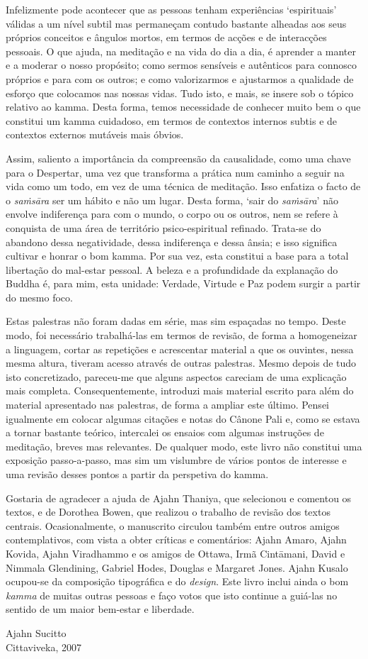 Infelizmente pode acontecer que as pessoas tenham experiências `espirituais'
válidas a um nível subtil mas permaneçam contudo bastante alheadas aos seus
próprios conceitos e ângulos mortos, em termos de acções e de interacções
pessoais. O que ajuda, na meditação e na vida do dia a dia, é aprender a manter
e a moderar o nosso propósito; como sermos sensíveis e autênticos para connosco
próprios e para com os outros; e como valorizarmos e ajustarmos a qualidade de
esforço que colocamos nas nossas vidas. Tudo isto, e mais, se insere sob o
tópico relativo ao kamma. Desta forma, temos necessidade de conhecer muito bem o
que constitui um kamma cuidadoso, em termos de contextos internos subtis e de
contextos externos mutáveis mais óbvios.

Assim, saliento a importância da compreensão da causalidade, como uma chave para
o Despertar, uma vez que transforma a prática num caminho a seguir na vida como
um todo, em vez de uma técnica de meditação. Isso enfatiza o facto de o
\emph{saṁsāra} ser um hábito e não um lugar. Desta forma, `sair do
\emph{saṁsāra}' não envolve indiferença para com o mundo, o corpo ou os outros,
nem se refere à conquista de uma área de território psico-espiritual refinado.
Trata-se do abandono dessa negatividade, dessa indiferença e dessa ânsia; e isso
significa cultivar e honrar o bom kamma. Por sua vez, esta constitui a base para
a total libertação do mal-estar pessoal. A beleza e a profundidade da explanação
do Buddha é, para mim, esta unidade: Verdade, Virtude e Paz podem surgir a
partir do mesmo foco.

Estas palestras não foram dadas em série, mas sim espaçadas no tempo. Deste
modo, foi necessário trabalhá-las em termos de revisão, de forma a homogeneizar
a linguagem, cortar as repetições e acrescentar material a que os ouvintes,
nessa mesma altura, tiveram acesso através de outras palestras. Mesmo depois de
tudo isto concretizado, pareceu-me que alguns aspectos careciam de uma
explicação mais completa. Consequentemente, introduzi mais material escrito para
além do material apresentado nas palestras, de forma a ampliar este último.
Pensei igualmente em colocar algumas citações e notas do Cânone Pali e, como se
estava a tornar bastante teórico, intercalei os ensaios com algumas instruções
de meditação, breves mas relevantes. De qualquer modo, este livro não constitui
uma exposição passo-a-passo, mas sim um vislumbre de vários pontos de interesse
e uma revisão desses pontos a partir da perspetiva do kamma.

Gostaria de agradecer a ajuda de Ajahn Thaniya, que selecionou e comentou os
textos, e de Dorothea Bowen, que realizou o trabalho de revisão dos textos
centrais. Ocasionalmente, o manuscrito circulou também entre outros amigos
contemplativos, com vista a obter críticas e comentários: Ajahn Amaro, Ajahn
Kovida, Ajahn Viradhammo e os amigos de Ottawa, Irmã Cintāmani, David e Nimmala
Glendining, Gabriel Hodes, Douglas e Margaret Jones. Ajahn Kusalo ocupou-se da
composição tipográfica e do \emph{design}. Este livro inclui ainda o bom
\emph{kamma} de muitas outras pessoas e faço votos que isto continue a guiá-las
no sentido de um maior bem-estar e liberdade.

{\raggedleft
Ajahn Sucitto\\
Cittaviveka, 2007
\par}
